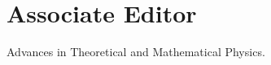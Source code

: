 \documentclass[hidelinks,a4paper]{article}
\begin{document}
\section*{Associate Editor}
Advances in Theoretical and Mathematical Physics.



\end{document}
